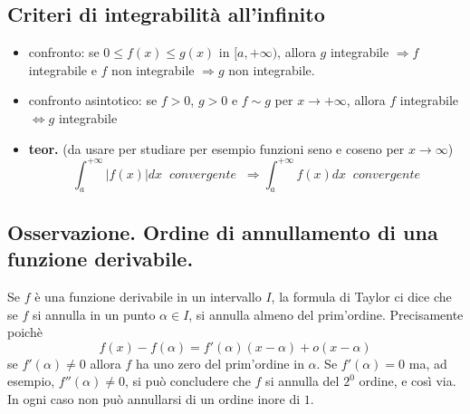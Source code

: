 \documentclass[a4paper, 9pt]{report}
\begin{document}
\subsection*{Criteri di integrabilità all'infinito}
\begin{itemize}
    \item confronto: se $0\leq f(x) \leq g(x)$ in $[a,+\infty)$, allora $g$ integrabile $\Rightarrow f$ integrabile e $f$ non integrabile $\Rightarrow g$ non integrabile.
    \item confronto asintotico: se $f>0$, $g>0$ e $f \sim g$ per $x \rightarrow + \infty$, allora $f$ integrabile $\Leftrightarrow g$ integrabile
    \item \textbf{teor.} (da usare per studiare per esempio funzioni seno e coseno per $x \rightarrow \infty$)
    \[
        \int_{a}^{+\infty}|f(x)| dx \;\; convergente \;\; \Rightarrow \int_{a}^{+\infty} f(x) dx \;\;convergente
    \]
\end{itemize}
\subsection*{Osservazione. Ordine di annullamento di una funzione derivabile.}
Se $f$ è una funzione derivabile in un intervallo $I$, la formula di Taylor ci dice che se $f$ si annulla in un punto $\alpha \in I$, si annulla almeno del prim'ordine. Precisamente poichè
\[
    f(x) - f(\alpha) = f'(\alpha)(x-\alpha) + o(x-\alpha)
\]
se $f'(\alpha) \neq 0$ allora $f$ ha uno zero del prim'ordine in $\alpha$. Se $f'(\alpha) = 0$ ma, ad esempio, $f''(\alpha) \neq 0$, si può concludere che $f$ si annulla del $2^0$ ordine, e così via. In ogni caso non può annullarsi di un ordine inore di $1$.
\end{document}
